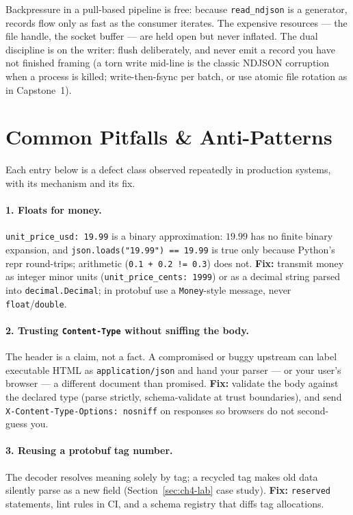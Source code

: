 \begin{keyconceptbox}
Backpressure in a pull-based pipeline is free: because \texttt{read\_ndjson} is a
generator, records flow only as fast as the consumer iterates. The expensive
resources --- the file handle, the socket buffer --- are held open but never
inflated. The dual discipline is on the writer: flush deliberately, and never emit
a record you have not finished framing (a torn write mid-line is the classic NDJSON
corruption when a process is killed; write-then-fsync per batch, or use atomic
file rotation as in Capstone~1).
\end{keyconceptbox}

\section{Common Pitfalls \& Anti-Patterns}
\label{sec:ch4-pitfalls}

Each entry below is a defect class observed repeatedly in production systems, with
its mechanism and its fix.

\paragraph{1. Floats for money.}
\texttt{unit\_price\_usd: 19.99} is a binary approximation:
$19.99$ has no finite binary expansion, and \texttt{json.loads("19.99") ==
19.99} is true only because Python's repr round-trips; arithmetic
(\texttt{0.1 + 0.2 != 0.3}) does not. \textbf{Fix:} transmit money as integer minor
units (\texttt{unit\_price\_cents: 1999}) or as a decimal string parsed into
\texttt{decimal.Decimal}; in protobuf use a \texttt{Money}-style message, never
\texttt{float}/\texttt{double}.

\paragraph{2. Trusting \texttt{Content-Type} without sniffing the body.}
The header is a claim, not a fact. A compromised or buggy upstream can label
executable HTML as \texttt{application/json} and hand your parser --- or your
user's browser --- a different document than promised. \textbf{Fix:} validate the
body against the declared type (parse strictly, schema-validate at trust
boundaries), and send \texttt{X-Content-Type-Options: nosniff} on responses so
browsers do not second-guess you.

\paragraph{3. Reusing a protobuf tag number.}
The decoder resolves meaning solely by tag; a recycled tag makes old data silently
parse as a new field (Section~\ref{sec:ch4-lab} case study). \textbf{Fix:}
\texttt{reserved} statements, lint rules in CI, and a schema registry that diffs
tag allocations.

